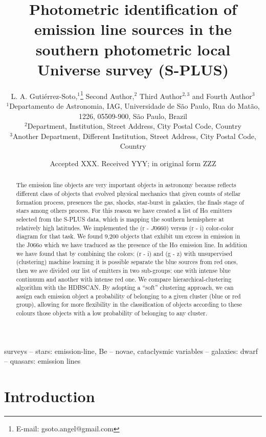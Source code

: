 \documentclass[fleqn,usenatbib]{mnras}
\title[S-PLUS: Emission line objects]{Photometric identification of emission
  line sources in the southern photometric local Universe survey (S-PLUS)}
\author[Guti\'{e}rrez-Soto et al.]{
L. A. Guti\'{e}rrez-Soto,$^{1}$\thanks{E-mail: gsoto.angel@gmail.com}
Second  Author,$^{2}$
Third Author$^{2,3}$
and Fourth Author$^{3}$
\\
$^{1}$Departamento de Astronomia, IAG, Universidade de S\~{a}o Paulo, Rua do Mat\~{a}o,
1226, 05509-900, S\~{a}o Paulo, Brazil\\
$^{2}$Department, Institution, Street Address, City Postal Code, Country\\
$^{3}$Another Department, Different Institution, Street Address, City Postal Code, Country
}
\date{Accepted XXX. Received YYY; in original form ZZZ}
\begin{document}
\label{firstpage}
\pagerange{\pageref{firstpage}--\pageref{lastpage}}
\maketitle

\begin{abstract}
  The emission line objects are very important objects in astronomy
  because reflects different class of objects that evolved physical
  mechanics that given counts of stellar formation process, presences
  the gas, shocks, star-burst in galaxies, the finals stage of stars
  among others process. For this reason we have created a list of
  H{$\alpha$} emitters selected from the S-PLUS data, which is mapping
  the southern hemisphere at relatively high latitudes. We implemented
  the (r - $J$0660) versus (r - i) color-color diagram for that task.
  We found 9,200 objects that exhibit um excess in emission in the J066o
  which we have traduced as the presence of the H{$\alpha$} emission line.
  In addition we have found that by combining the colors: (r - i) and (g - z)
  with unsupervised (clustering) machine learning it is possible separate
  the blue sources from red ones, then we ave divided our list of emitters
  in two sub-groups: one with intense blue continuum and another with
  intense red one. We compare hierarchical-clustering algorithm with the
  HDBSCAN. By adopting a ``soft'' clustering approach, we can assign
  each emission object a probability of belonging to a given cluster
  (blue or red group), allowing for more flexibility in the classification
  of objects according to these colours those objects with a low probability
  of belonging to any cluster. 
\end{abstract}
\begin{keywords}
  surveys -- stars: emission-line, Be -- novae, cataclysmic variables
  -- galaxies: dwarf -- quasars: emission lines
\end{keywords}



\section{Introduction}
\end{document}

